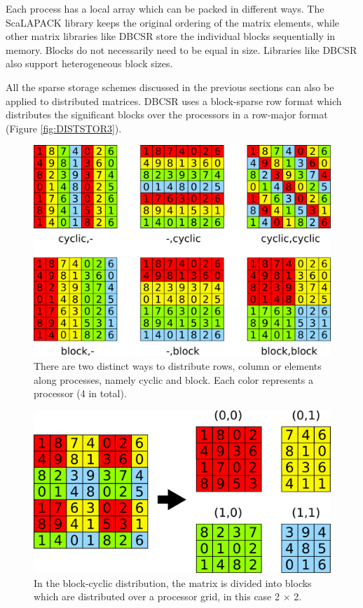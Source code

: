 Each process has a local array which can be packed in different ways. The ScaLAPACK library keeps the original ordering of the matrix elements, while other matrix libraries like DBCSR store the individual blocks sequentially in memory. Blocks do not necessarily need to be equal in size. Libraries like DBCSR also support heterogeneous block sizes.

All the sparse storage schemes discussed in the previous sections can also be applied to distributed matrices. DBCSR uses a block-sparse row format which distributes the significant blocks over the processors in a row-major format (Figure \ref{fig:DISTSTOR3}). 

\begin{figure}
\centering
\includegraphics[scale=0.25]{Pics/DISTSTOR1.pdf}
\caption[Cyclic and blocked distribution]{There are two distinct ways to distribute rows, column or elements along processes, namely cyclic and block. Each color represents a processor (4 in total).}
\label{fig:DISTSTOR1}
\end{figure}

\begin{figure}
\centering
\includegraphics[scale=0.25]{Pics/DISTSTOR2.pdf}
\caption[Block-cyclic distribution]{In the block-cyclic distribution, the matrix is divided into blocks which are distributed over a processor grid, in this case 2 $\times$ 2.}
\label{fig:DISTSTOR2}
\end{figure}

